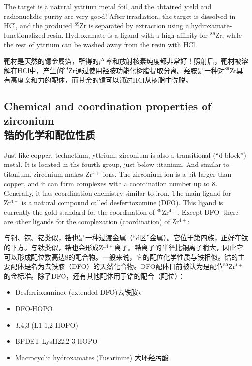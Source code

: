 \documentclass[dvipsnames, svgnames,a4paper,11pt]{article}
\begin{document}
The target is a natural yttrium metal foil, and the obtained yield and radionuclidic purity are very good! After irradiation, the target is dissolved in HCl, and the produced \(\mathrm{^{89}Zr}\) is separated by extraction using a hydroxamate-functionalized resin. Hydroxamate is a ligand with a high affinity for \(\mathrm{^{89}Zr}\), while the rest of yttrium can be washed away from the resin with HCl.

靶材是天然的镱金属箔，所得的产率和放射核素纯度都非常好！照射后，靶材被溶解在HCl中，产生的\(\mathrm{^{89}Zr}\)通过使用羟胺功能化树脂提取分离。羟胺是一种对\(\mathrm{^{89}Zr}\)具有高度亲和力的配体，而其余的镱可以通过HCl从树脂中洗脱。

\subsection{Chemical and coordination properties of zirconium\\ 锆的化学和配位性质}  


Just like copper, technetium, yttrium, zirconium is also a transitional (“d-block”) metal. It is located in the fourth group, just below titanium. And similar to titanium, zirconium makes \(\mathrm{Zr^{4+}}\) ions. The zirconium ion is a bit larger than copper, and it can form complexes with a coordination number up to 8. Generally, it has coordination chemistry similar to iron. The main ligand for \(\mathrm{Zr^{4+}}\) is a natural compound called desferrioxamine (DFO). This ligand is currently the gold standard for the coordination of \(\mathrm{^{89}Zr^{4+}}\). Except DFO, there are other ligands for the complexation (coordination) of \(\mathrm{Zr^{4+}}\):

与铜、铼、钇类似，锆也是一种过渡金属（“d区”金属）。它位于第四族，正好在钛的下方。与钛类似，锆也会形成\(\mathrm{Zr^{4+}}\)离子。锆离子的半径比铜离子稍大，因此它可以形成配位数高达8的配合物。一般来说，它的配位化学性质与铁相似。锆的主要配体是名为去铁胺（DFO）的天然化合物。DFO配体目前被认为是配位\(\mathrm{^{89}Zr^{4+}}\)的金标准。除了DFO，还有其他配体用于锆的配合（配位）：

\begin{itemize}
  \item Desferrioxamine$\star$ (extended DFO)去铁胺$\star$
  \item DFO-HOPO
  \item 3,4,3-(L1-1,2-HOPO)
  \item BPDET-LysH22,2-3-HOPO
  \item Macrocyclic hydroxamates (Fusarinine) 大环羟肟酸
\end{itemize}
\end{document}
